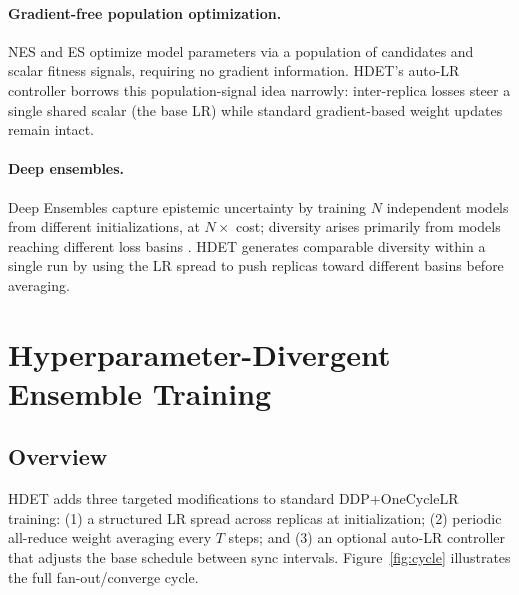\documentclass{article}
\begin{document}
\paragraph{Gradient-free population optimization.}
NES \citep{wierstra2014natural} and ES \citep{salimans2017evolution} optimize model
parameters via a population of candidates and scalar fitness signals, requiring no
gradient information.
HDET's auto-LR controller borrows this population-signal idea narrowly: inter-replica
losses steer a single shared scalar (the base LR) while standard gradient-based weight
updates remain intact.

\paragraph{Deep ensembles.}
Deep Ensembles \citep{lakshminarayanan2017simple} capture epistemic uncertainty by
training $N$ independent models from different initializations, at $N\times$ cost;
diversity arises primarily from models reaching different loss basins
\citep{fort2019deep}.
HDET generates comparable diversity within a single run by using the LR spread to
push replicas toward different basins before averaging.

\section{Hyperparameter-Divergent Ensemble Training}
\label{sec:method}

\subsection{Overview}

HDET adds three targeted modifications to standard DDP+OneCycleLR training:
(1) a structured LR spread across replicas at initialization;
(2) periodic all-reduce weight averaging every $T$ steps;
and (3) an optional auto-LR controller that adjusts the base schedule between sync
intervals.  Figure~\ref{fig:cycle} illustrates the full fan-out/converge cycle.
\end{document}
